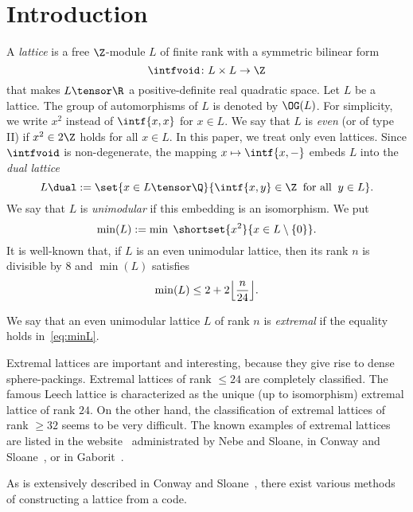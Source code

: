 \documentclass{amsart}
\DeclarePairedDelimiter\floor{\lfloor}{\rfloor}
\begin{document}
\section{Introduction}
%
A \emph{lattice} is a free $\Z$-module $L$ of finite rank
with a symmetric bilinear form
$$
\intfvoid\colon L\times L\to \Z
$$
that makes $L\tensor\R$ a positive-definite real quadratic space.
Let $L$ be a lattice.
The group of automorphisms  of $L$ is denoted by $\OG(L)$.
For simplicity, we write $x^2$ instead of  $\intf{x,x}$ for $x\in L$.
We say that $L$ is \emph{even} (or of type II) if $x^2 \in 2\Z$  holds for all $x\in L$.
In this paper,
we treat only even lattices.
Since $\intfvoid$ is non-degenerate,
the mapping $x\mapsto \intf{x, -}$ embeds $L$ into 
the \emph{dual lattice}
$$
L\dual:=\set{x\in L\tensor\Q}{\intf{x, y}\in \Z\;\; \textrm{for all}\;\; y\in L}.
$$
We say that  $L$ is \emph{unimodular} if this embedding is an isomorphism.
We put
$$
\min (L):=\min\; \shortset{x^2}{ x\in L\setminus \{0\}}.
$$
It is well-known that, if $L$ is an even unimodular lattice, then
its rank $n$ is divisible by $8$ and $\min (L)$ satisfies
%
\begin{equation}\label{eq:minL}
\min (L)\le 2+2 \floor*{\frac{n}{24}}.
\end{equation}
%
\begin{definition}
We say that an even unimodular lattice $L$ of rank $n$ is \emph{extremal}
if the equality holds in~\eqref{eq:minL}.
\end{definition}
%
Extremal lattices are important and interesting,
because they give rise to dense sphere-packings.
%
Extremal lattices of rank $\le 24$ are completely classified.
The famous Leech lattice 
is characterized as the unique (up to isomorphism) extremal lattice of rank  $24$.
On the other hand, the classification of extremal lattices of rank $\ge 32$ seems to be very difficult.
The known examples of extremal lattices
are listed in the website~\cite{NS} administrated by  Nebe and Sloane,
in  Conway and Sloane~\cite[Chapter 1]{CS99},
or in  Gaborit~\cite[Table 3]{Gab2004}.
\par
As is extensively described in Conway and Sloane~\cite{CS99},
there exist various methods of constructing a lattice from a code.
\end{document}
